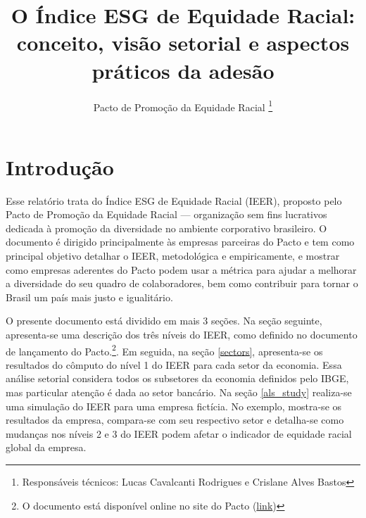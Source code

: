 \documentclass[12pt]{article}
\begin{document}
 

\linespread{1.1}

\title{%
  O Índice ESG de Equidade Racial: conceito, visão setorial e aspectos práticos da adesão
}
\author{Pacto de Promoção da Equidade Racial \thanks{Responsáveis técnicos: Lucas Cavalcanti Rodrigues e Crislane Alves Bastos}}

\maketitle

\section*{Introdução}

\par Esse relatório trata do Índice ESG de Equidade Racial (IEER), proposto pelo Pacto de Promoção da Equidade Racial --- organização sem fins lucrativos dedicada à promoção da diversidade no ambiente corporativo brasileiro. O documento é dirigido principalmente às empresas parceiras do Pacto e tem como principal objetivo detalhar o IEER, metodológica e empiricamente, e mostrar como empresas aderentes do Pacto podem usar a métrica para ajudar a melhorar a diversidade do seu quadro de colaboradores, bem como contribuir para tornar o Brasil um país mais justo e igualitário.

\par O presente documento está dividido em mais 3 seções. Na seção seguinte, apresenta-se uma descrição dos três níveis do IEER, como definido no documento de lançamento do Pacto.\footnote{O documento está disponível online no site do Pacto (\hyperlink{http://pactopelaequidaderacial.org.br/assets/files/PACTO-DEPROMOODAEQUIDADERACIAL-PaperInstrutivo-1.12.2021-1.pdf}{link})}. Em seguida, na seção \ref{sectors}, apresenta-se os resultados do cômputo do nível 1 do IEER para cada setor da economia. Essa análise setorial considera todos os subsetores da economia definidos pelo IBGE, mas particular atenção é dada ao setor bancário. Na seção \ref{als_study} realiza-se uma simulação do IEER para uma empresa fictícia. No exemplo, mostra-se os resultados da empresa, compara-se com seu respectivo setor e detalha-se como mudanças nos níveis 2 e 3 do IEER podem afetar o indicador de equidade racial global da empresa.

\clearpage
\end{document}
